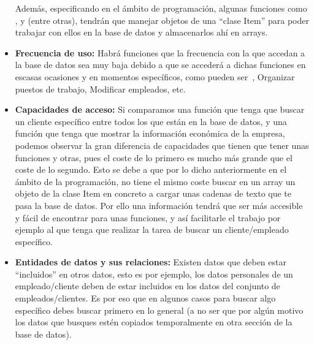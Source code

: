 \documentclass[11pt, a4paper, twoside]{report}
\begin{document}
\begin{itemize}
				Además, especificando en el ámbito de programación, algunas funciones como ,  y  (entre otras), tendrán que manejar objetos de una ``clase Item'' para poder trabajar con ellos en la base de datos y almacenarlos ahí en \gls{arrays}. 
				\item \textbf{Frecuencia de uso: } Habrá funciones que la frecuencia con la que accedan a la base de datos sea muy baja debido a que se accederá a dichas funciones en escasas ocasiones y en momentos específicos, como pueden ser~, Organizar puestos de trabajo, Modificar empleados, etc. 
				\item \textbf{Capacidades de acceso: } Si comparamos una función que tenga que buscar un cliente específico entre todos los que están en la base de datos, y una función que tenga que mostrar la información económica de la empresa, podemos observar la gran diferencia de capacidades que tienen que tener unas funciones y otras, pues el coste de lo primero es mucho más grande que el coste de lo segundo. Esto se debe a que por lo dicho anteriormente en el ámbito de la programación, no tiene el mismo coste buscar en un array un objeto de la clase Item en concreto a cargar unas cadenas de texto que te pasa la base de datos. Por ello una información tendrá que ser más accesible y fácil de encontrar para unas funciones, y así facilitarle el trabajo por ejemplo al que tenga que realizar la tarea de buscar un cliente/empleado específico. 
				\item \textbf{Entidades de datos y sus relaciones: } Existen datos que deben estar ``incluidos'' en otros datos, esto es por ejemplo, los datos personales de un empleado/cliente deben de estar incluidos en los datos del conjunto de empleados/clientes. Es por eso que en algunos casos para buscar algo específico debes buscar primero en lo general (a no ser que por algún motivo los datos que busques estén copiados temporalmente en otra sección de la base de datos). 
			\end{itemize}
\end{document}
